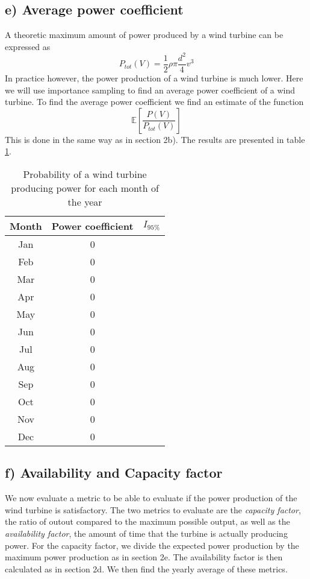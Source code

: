 \documentclass[a4paper]{article}
\begin{document}
\subsection*{e) Average power coefficient}
A theoretic maximum amount of power produced by a wind turbine can be expressed as
\begin{equation}
    P_{tot}(V) = \frac{1}{2}\rho\pi\frac{d^2}{4}v^3
\end{equation}
In practice however, the power production of a wind turbine is much lower. Here we will use importance sampling to find an average power coefficient of a wind turbine. To find the average power coefficient we find an estimate of the function
\begin{equation}
  \mathbb{E}[\frac{P(V)}{P_{tot}(V)}]
\end{equation}
This is done in the same way as in section 2b). The results are presented in table \ref{powercoeff}.
\begin{table}
    \centering
    \caption{Probability of a wind turbine producing power for each month of the year}
    \label{powercoeff}
    \begin{tabular}{|c|| c c ||}
        \hline
        Month & Power coefficient & $I_{95\%}$ \\
        \hline
        Jan & 0 &\\
        \hline
        Feb & 0 &\\
        \hline
        Mar & 0 &\\
        \hline
        Apr & 0 &\\
        \hline
        May & 0 &\\
        \hline
        Jun & 0 &\\
        \hline
        Jul & 0 &\\
        \hline
        Aug & 0 &\\
        \hline
        Sep & 0 &\\
        \hline
        Oct & 0 &\\
        \hline
        Nov & 0 &\\
        \hline
        Dec & 0 &\\
        \hline

    \end{tabular}
\end{table}

\subsection*{f) Availability and Capacity factor}
We now evaluate a metric to be able to evaluate if the power production of the wind turbine is satisfactory. The two metrics to evaluate are the \textit{capacity factor}, the ratio of outout compared to the maximum possible output, as well as the \textit{availability factor}, the amount of time that the turbine is actually producing power. For the capacity factor, we divide the expected power production by the maximum power production as in section 2e. The availability factor is then calculated as in section 2d. We then find the yearly average of these metrics.
\end{document}
